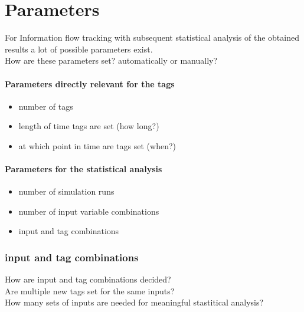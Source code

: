 \documentclass{article}
\begin{document}
\newpage

\section*{Parameters}

For Information flow tracking with subsequent statistical analysis of the obtained results a lot of possible parameters exist.\\
How are these parameters set? automatically or manually?\\

\paragraph*{Parameters directly relevant for the tags}
\begin{itemize}
    \item number of tags
    \item length of time tags are set (how long?)
    \item at which point in time are tags set (when?)
\end{itemize}

\paragraph*{Parameters for the statistical analysis}
\begin{itemize}
    \item number of simulation runs
    \item number of input variable combinations 
    \item input and tag combinations
\end{itemize}

\subsubsection*{input and tag combinations}
How are input and tag combinations decided?\\
Are multiple new tags set for the same inputs?\\
How many sets of inputs are needed for meaningful stastitical analysis?\\
\end{document}

